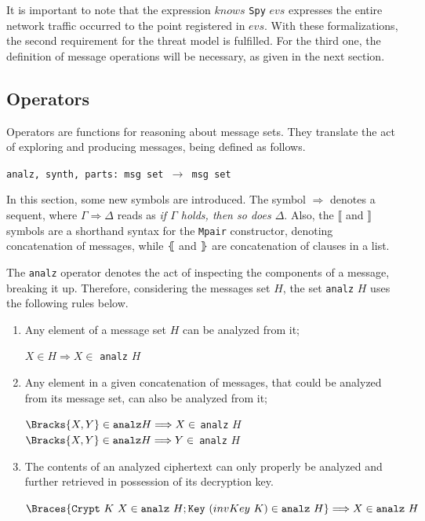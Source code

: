 It is important to note that the expression \(knows\) \texttt{Spy} \(evs\) expresses the entire network traffic occurred to the point registered in \(evs\). With these formalizations, the second requirement for the threat model is fulfilled. For the third one, the definition of message operations will be necessary, as given in the next section.



\subsection{Operators}\label{ssec:operators}
Operators are functions for reasoning about message sets. They translate the act of exploring and producing messages, being defined as follows.

\begin{center}
  \texttt{analz, synth, parts: msg set \(\longrightarrow \) msg set}
\end{center}

In this section, some new symbols are introduced. The symbol \(\Longrightarrow \) denotes a sequent, where \(\Gamma \Longrightarrow \Delta \) reads as {\em if \(\Gamma \) holds, then so does \(\Delta \)}. Also, the \(\lBrack \) and \(\rBrack \) symbols are a shorthand syntax for the \texttt{Mpair} constructor, denoting concatenation of messages, while \(\lBrace \) and \(\rBrace \) are concatenation of clauses in a list.

The \texttt{analz} operator denotes the act of inspecting the components of a message, breaking it up. Therefore, considering the messages set \(H\), the set \texttt{analz} \(H\) uses the following rules below.

\begin{enumerate}
  \item Any element of a message set \(H\) can be analyzed from it;
  \begin{center}
    \(X \in H \Longrightarrow X \in \) \texttt{analz} \(H\)
  \end{center}

  \item Any element in a given concatenation of messages, that could be analyzed from its message set, can also be analyzed from it;
  \begin{center}
    \(\Bracks{X,Y} \in \texttt{analz} H \Longrightarrow X \in \) \texttt{analz} \(H\) \\
    \(\Bracks{X,Y} \in \texttt{analz} H \Longrightarrow Y \in \) \texttt{analz} \(H\)
  \end{center}

  \item The contents of an analyzed ciphertext can only properly be analyzed and further retrieved in possession of its decryption key.
  \begin{center}
    \(\Braces{\texttt{Crypt}\ K\ X \in \texttt{analz}\ H; \texttt{Key}\ (invKey\ K) \in \texttt{analz}\ H} \Longrightarrow X \in \texttt{analz}\ H\)
  \end{center}
\end{enumerate}

